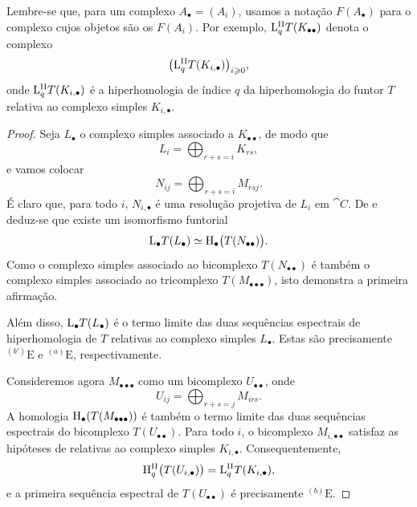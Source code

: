 Lembre-se que, para um complexo $A_\bullet=(A_i)$, usamos a notação
$F(A_\bullet)$ para o complexo cujos objetos são os $F(A_i)$.
Por exemplo, $\mathrm{L}^{\mathrm{II}}_qT(K_{\bullet\bullet})$ denota o complexo
\[
  \bigl(\mathrm{L}^{\mathrm{II}}_qT(K_{i,\bullet})\bigr)_{i\geqslant 0},
\]
onde $\mathrm{L}^{\mathrm{II}}_qT(K_{i,\bullet})$ é a hiperhomologia de índice
$q$ da hiperhomologia do funtor $T$ relativa ao complexo simples $K_{i,\bullet}$.

\begin{proof}
Seja $L_\bullet$ o complexo simples associado a
$K_{\bullet\bullet}$, de modo que
\[
  L_i=\bigoplus_{r+s=i}K_{rs},
\]
e vamos colocar
\[
  N_{ij}=\bigoplus_{r+s=i}M_{rsj}.
\]
É claro que, para todo $i$, $N_{i,\bullet}$ é uma resolução projetiva
de $L_i$ em $\cat{C}$.
De  e  deduz-se que existe um
isomorfismo funtorial
\[
  \mathrm{L}_\bullet T(L_\bullet)
  \simeq
  \mathrm{H}_\bullet\bigl(T(N_{\bullet\bullet})\bigr).
\]
Como o complexo simples associado ao bicomplexo
$T(N_{\bullet\bullet})$ é também o complexo simples associado ao
tricomplexo $T(M_{\bullet\bullet\bullet})$, isto demonstra a primeira afirmação.

Além disso, $\mathrm{L}_\bullet T(L_\bullet)$ é o termo limite das duas
sequências espectrais de hiperhomologia  de $T$ relativas ao
complexo simples $L_\bullet$.
Estas são precisamente ${}^{(b')}\mathrm{E}$ e ${}^{(a)}\mathrm{E}$,
respectivamente.

Consideremos agora $M_{\bullet\bullet\bullet}$ como um bicomplexo
$U_{\bullet\bullet}$, onde
\[
  U_{ij}=\bigoplus_{r+s=j}M_{irs}.
\]
A homologia $\mathrm{H}_\bullet(T(M_{\bullet\bullet\bullet}))$ é também o
termo limite das duas sequências espectrais do bicomplexo
$T(U_{\bullet\bullet})$.
Para todo $i$, o bicomplexo $M_{i,\bullet\bullet}$ satisfaz as
hipóteses de  relativas ao complexo simples
$K_{i,\bullet}$.
Consequentemente,
\[
  \mathrm{H}^{\mathrm{II}}_q\bigl(T(U_{i,\bullet})\bigr)
  =
  \mathrm{L}^{\mathrm{II}}_qT(K_{i,\bullet}),
\]
e a primeira sequência espectral de $T(U_{\bullet\bullet})$ é precisamente
${}^{(b)}\mathrm{E}$.


\end{proof}
